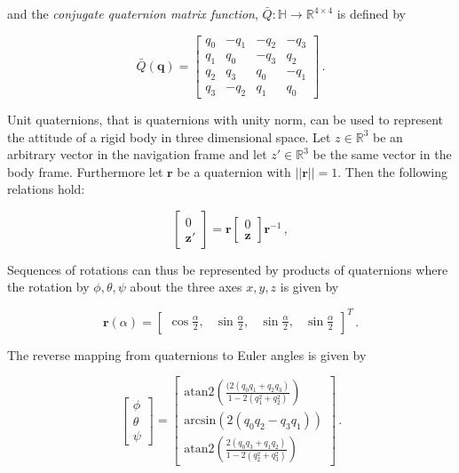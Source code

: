 \noindent
and the \emph{conjugate quaternion matrix function}, $\bar{Q} : \mathbb{H} \rightarrow \mathbb{R}^{4\times4}$ is defined by

\begin{equation}
	\bar{Q}(\mathbf{q}) = \begin{bmatrix}
 q_0 & -q_1 & -q_2 & -q_3\\
 q_1 & q_0 & -q_3 & q_2\\
 q_2 & q_3 & q_0 & -q_1 \\
 q_3 & -q_2 & q_1 & q_0
\end{bmatrix}\,.
\end{equation}



Unit quaternions, that is quaternions with unity norm, can be used to represent the attitude of a rigid body in three dimensional space. Let $z \in \mathbb{R}^3$ be an arbitrary vector in the navigation frame and let $z' \in \mathbb{R}^3$ be the same vector in the body frame. Furthermore let $\mathbf{r}$ be a quaternion with $||\mathbf{r}|| = 1$. Then the following relations hold:

\begin{equation}
  \begin{bmatrix}
  	0 \\ \mathbf{z}' 
  \end{bmatrix} = \mathbf{r} \begin{bmatrix}
  	0 \\ \mathbf{z} 
  \end{bmatrix} \mathbf{r}^{-1}\,,
\end{equation}

\noindent
Sequences of rotations can thus be represented by products of quaternions where the rotation by $\phi, \theta, \psi$ about the three axes $x, y, z$ is given by

\begin{equation}
  \mathbf{r}(\alpha) = \begin{bmatrix}
  	\cos \frac{\alpha}{2}, & \sin \frac{\alpha}{2}, & \sin \frac{\alpha}{2}, & \sin \frac{\alpha}{2}
  \end{bmatrix}^T\,.
\end{equation}

The reverse mapping from quaternions to Euler angles is given by

\begin{equation}
  \begin{bmatrix}
\phi \\ \theta \\ \psi
\end{bmatrix} =
\begin{bmatrix}
\mbox{atan2} (\frac{(2(q_0 q_1 + q_2 q_3)}{1 - 2(q_1^2 + q_2^2)}) \\
\mbox{arcsin} (2(q_0 q_2 - q_3 q_1)) \\
\mbox{atan2} (\frac{2(q_0 q_3 + q_1 q_2)}{1 - 2(q_2^2 + q_3^2)})
\end{bmatrix}\,.
\end{equation}

